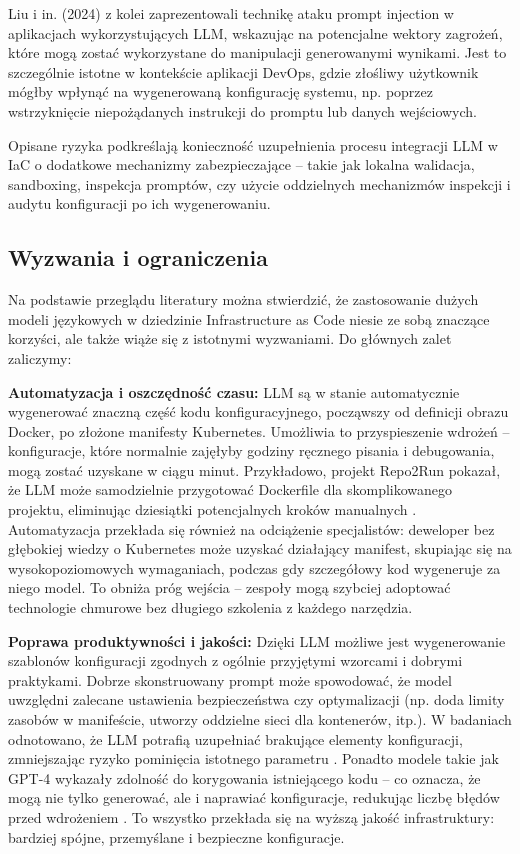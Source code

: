 Liu i in. (2024) \cite{liu_prompt_2024} z kolei zaprezentowali technikę ataku prompt injection w aplikacjach wykorzystujących LLM, wskazując na potencjalne wektory zagrożeń, które mogą zostać wykorzystane do manipulacji generowanymi wynikami. Jest to szczególnie istotne w kontekście aplikacji DevOps, gdzie złośliwy użytkownik mógłby wpłynąć na wygenerowaną konfigurację systemu, np. poprzez wstrzyknięcie niepożądanych instrukcji do promptu lub danych wejściowych.

Opisane ryzyka podkreślają konieczność uzupełnienia procesu integracji LLM w IaC o dodatkowe mechanizmy zabezpieczające – takie jak lokalna walidacja, sandboxing, inspekcja promptów, czy użycie oddzielnych mechanizmów inspekcji i audytu konfiguracji po ich wygenerowaniu.

\subsection{Wyzwania i ograniczenia}

Na podstawie przeglądu literatury można stwierdzić, że zastosowanie dużych modeli językowych w dziedzinie Infrastructure as Code niesie ze sobą znaczące korzyści, ale także wiąże się z istotnymi wyzwaniami. Do głównych zalet zaliczymy:

\textbf{Automatyzacja i oszczędność czasu:} LLM są w stanie automatycznie wygenerować znaczną część kodu konfiguracyjnego, począwszy od definicji obrazu Docker, po złożone manifesty Kubernetes. Umożliwia to przyspieszenie wdrożeń – konfiguracje, które normalnie zajęłyby godziny ręcznego pisania i debugowania, mogą zostać uzyskane w ciągu minut. Przykładowo, projekt Repo2Run pokazał, że LLM może samodzielnie przygotować Dockerfile dla skomplikowanego projektu, eliminując dziesiątki potencjalnych kroków manualnych \cite{hu_llm-based_2025}. Automatyzacja przekłada się również na odciążenie specjalistów: deweloper bez głębokiej wiedzy o Kubernetes może uzyskać działający manifest, skupiając się na wysokopoziomowych wymaganiach, podczas gdy szczegółowy kod wygeneruje za niego model. To obniża próg wejścia – zespoły mogą szybciej adoptować technologie chmurowe bez długiego szkolenia z każdego narzędzia.

\textbf{Poprawa produktywności i jakości:} Dzięki LLM możliwe jest wygenerowanie szablonów konfiguracji zgodnych z ogólnie przyjętymi wzorcami i dobrymi praktykami. Dobrze skonstruowany prompt może spowodować, że model uwzględni zalecane ustawienia bezpieczeństwa czy optymalizacji (np. doda limity zasobów w manifeście, utworzy oddzielne sieci dla kontenerów, itp.). W badaniach odnotowano, że LLM potrafią uzupełniać brakujące elementy konfiguracji, zmniejszając ryzyko pominięcia istotnego parametru \cite{kratzke_dont_2024}. Ponadto modele takie jak GPT-4 wykazały zdolność do korygowania istniejącego kodu – co oznacza, że mogą nie tylko generować, ale i naprawiać konfiguracje, redukując liczbę błędów przed wdrożeniem \cite{low_repairing_2024}. To wszystko przekłada się na wyższą jakość infrastruktury: bardziej spójne, przemyślane i bezpieczne konfiguracje.


